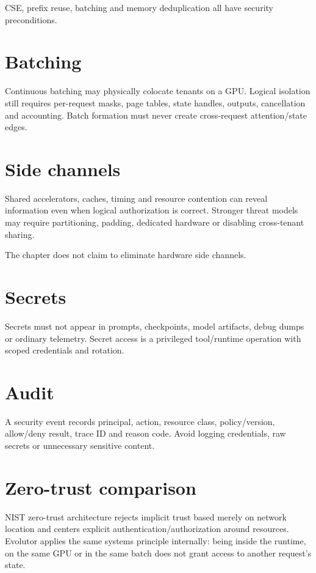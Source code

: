 CSE, prefix reuse, batching and memory deduplication all have security preconditions.

\section{Batching}
Continuous batching may physically colocate tenants on a GPU. Logical isolation still requires per-request masks, page tables, state handles, outputs, cancellation and accounting. Batch formation must never create cross-request attention/state edges.

\section{Side channels}
Shared accelerators, caches, timing and resource contention can reveal information even when logical authorization is correct. Stronger threat models may require partitioning, padding, dedicated hardware or disabling cross-tenant sharing.

The chapter does not claim to eliminate hardware side channels.

\section{Secrets}
Secrets must not appear in prompts, checkpoints, model artifacts, debug dumps or ordinary telemetry. Secret access is a privileged tool/runtime operation with scoped credentials and rotation.

\section{Audit}
A security event records principal, action, resource class, policy/version, allow/deny result, trace ID and reason code. Avoid logging credentials, raw secrets or unnecessary sensitive content.

\section{Zero-trust comparison}
NIST zero-trust architecture rejects implicit trust based merely on network location and centers explicit authentication/authorization around resources. Evolutor applies the same systems principle internally: being inside the runtime, on the same GPU or in the same batch does not grant access to another request's state.

